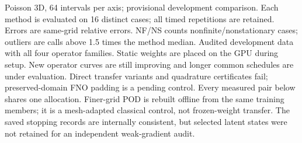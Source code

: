 \begin{table}[htbp]
\caption{Poisson 3D, 64 intervals per axis; provisional development comparison. Each method is evaluated on 16 distinct cases; all timed repetitions are retained. Errors are same-grid relative errors. NF/NS counts nonfinite/nonstationary cases; outliers are calls above 1.5 times the method median. Audited development data with all four operator families. Static weights are placed on the GPU during setup. New operator curves are still improving and longer common schedules are under evaluation. Direct transfer variants and quadrature certificates fail; preserved-domain FNO padding is a pending control. Every measured pair below shares one allocation. Finer-grid POD is rebuilt offline from the same training members; it is a mesh-adapted classical control, not frozen-weight transfer. The saved stopping records are internally consistent, but selected latent states were not retained for an independent weak-gradient audit.}
\label{tab:poisson3d-extra03-n64}
\end{table}
